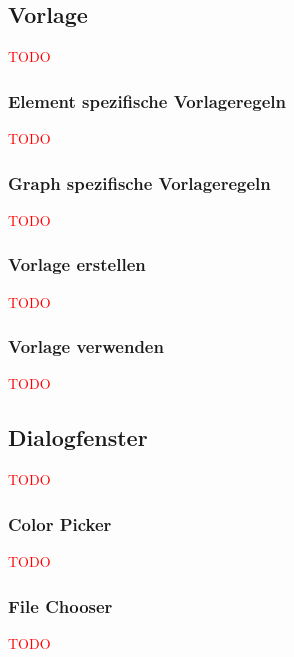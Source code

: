 \documentclass[enabledeprecatedfontcommands,fontsize=11pt,paper=a4,twoside]{scrartcl}
\newcommand*{\red}{\textcolor{red}}
\begin{document}
\subsection{Vorlage} \label{template}
\red{TODO}

\subsubsection{Element spezifische Vorlageregeln}
\red{TODO}

\subsubsection{Graph spezifische Vorlageregeln}
\red{TODO}
		
\subsubsection{Vorlage erstellen}
\red{TODO}

\subsubsection{Vorlage verwenden}
\red{TODO}
			 
		
\subsection{Dialogfenster} \label{dialog}
\red{TODO}

\subsubsection{Color Picker} \label{colorpicker}
\red{TODO}

\subsubsection{File Chooser} 
\red{TODO}
\end{document}

